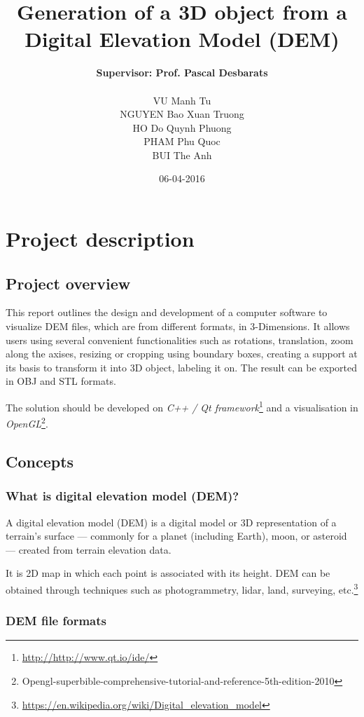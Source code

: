 \documentclass[11pt]{article}
\title{\textbf{Generation of a 3D object from a Digital Elevation Model (DEM)}}
\author{\textbf{Supervisor: Prof. Pascal Desbarats}\\\\
		VU Manh Tu\\
		NGUYEN Bao Xuan Truong\\
		HO Do Quynh Phuong\\
		PHAM Phu Quoc\\
		BUI The Anh		
		}
\date{06-04-2016}
\begin{document}
\maketitle
\section{Project description}
\subsection{Project overview}
This report outlines the design and development of a computer software to visualize DEM files, which are from different formats, in 3-Dimensions. It allows users using several convenient functionalities such as rotations, translation, zoom along the axises, resizing or cropping using boundary boxes, creating a support at its basis to transform it into 3D object, labeling it on. The result can be exported in OBJ and STL formats. 

The solution should be developed on \emph{C++ / Qt framework}\footnote{\url{http://http://www.qt.io/ide/}} and a visualisation in \emph{OpenGL}\footnote{Opengl-superbible-comprehensive-tutorial-and-reference-5th-edition-2010}.

\subsection{Concepts}
\subsubsection{What is digital elevation model (DEM)?}
A digital elevation model (DEM) is a digital model or 3D representation of a terrain's surface — commonly for a planet (including Earth), moon, or asteroid — created from terrain elevation data.
\par\noindent It is 2D map in which each point is associated with its height. DEM can be obtained through techniques such as photogrammetry, lidar, land, surveying, etc.\footnote{\url{https://en.wikipedia.org/wiki/Digital_elevation_model}}


\subsubsection{DEM file formats}
\end{document}
